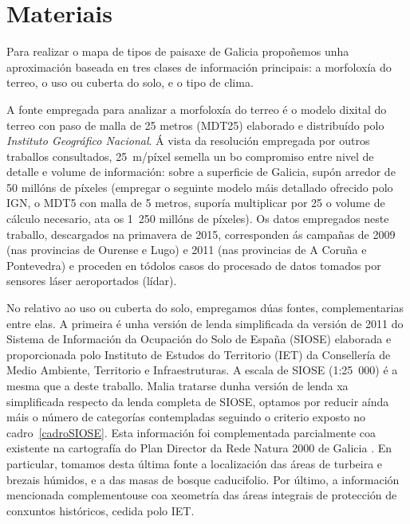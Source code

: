 \documentclass[11pt,a4paper]{article}
\begin{document}
\section{Materiais}


Para realizar o mapa de tipos de paisaxe de Galicia propoñemos unha aproximación baseada en tres clases de información principais: a morfoloxía do terreo, o uso ou cuberta do solo, e o tipo de clima.


A fonte empregada para analizar a morfoloxía do terreo é o modelo dixital do terreo con paso de malla de 25 metros (MDT25) elaborado e distribuído polo \emph{Instituto Geográfico Nacional}. Á vista da resolución empregada por outros traballos consultados, 25~m/píxel semella un bo compromiso entre nivel de detalle e volume de información: sobre a superficie de Galicia, supón arredor de 50 millóns de píxeles (empregar o seguinte modelo máis detallado ofrecido polo IGN, o MDT5 con malla de 5 metros, suporía multiplicar por 25 o volume de cálculo necesario, ata os 1~250 millóns de píxeles). Os datos empregados neste traballo, descargados na primavera de 2015, corresponden ás campañas de 2009 (nas provincias de Ourense e Lugo) e 2011 (nas provincias de A Coruña e Pontevedra) e proceden en tódolos casos do procesado de datos tomados por sensores láser aeroportados (lídar).


No relativo ao uso ou cuberta do solo, empregamos dúas fontes, complementarias entre elas. A primeira é unha versión de lenda simplificada da versión de 2011 do Sistema de Información da Ocupación do Solo de España (SIOSE) elaborada e proporcionada polo Instituto de Estudos do Territorio (IET) da Consellería de Medio Ambiente, Territorio e Infraestruturas. A escala de SIOSE (1:25~000) é a mesma que a deste traballo. Malia tratarse dunha versión de lenda xa simplificada respecto da lenda completa de SIOSE, optamos por reducir aínda máis o número de categorías contempladas seguindo o criterio exposto no cadro~\ref{cadroSIOSE}. Esta información foi complementada parcialmente coa existente na cartografía do Plan Director da Rede Natura 2000 de Galicia \citep{PDRN2011}. En particular, tomamos desta última fonte a localización das áreas de turbeira e brezais húmidos, e a das masas de bosque caducifolio. Por último, a información mencionada complementouse coa xeometría das áreas integrais de protección de conxuntos históricos, cedida polo IET.
\end{document}
